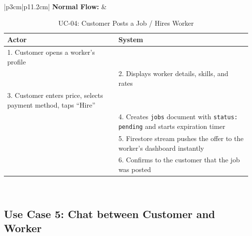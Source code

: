 {\small
\renewcommand{\arraystretch}{1.05}
\begin{table}[H]
\centering
\begin{tabular}{|p{3cm}|p{11.2cm}|}
\hline
\textbf{Normal Flow:} &
\begin{tabular}[t]{|p{5.4cm}|p{5.4cm}|}
\hline
\textbf{Actor} & \textbf{System} \\ \hline
1. Customer opens a worker's profile & \\ \hline
 & 2. Displays worker details, skills, and rates \\ \hline
3. Customer enters price, selects payment method, taps ``Hire'' & \\ \hline
 & 4. Creates \texttt{jobs} document with \texttt{status: pending} and starts expiration timer \\ \hline
 & 5. Firestore stream pushes the offer to the worker's dashboard instantly \\ \hline
 & 6. Confirms to the customer that the job was posted \\ \hline
\end{tabular} \\ \hline
\end{tabular}
\caption{UC-04: Customer Posts a Job / Hires Worker}
\end{table}
}

\newpage

\subsection*{Use Case 5: Chat between Customer and Worker}

